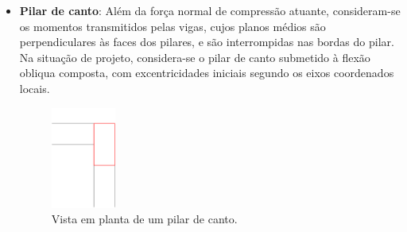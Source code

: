 \begin{itemize}
	\item \textbf{Pilar de canto}: Além da força normal de compressão atuante, consideram-se os momentos transmitidos pelas vigas, cujos planos médios são perpendiculares às faces dos pilares, e são interrompidas nas bordas do pilar. Na situação de projeto, considera-se o pilar de canto submetido à flexão obliqua composta, com excentricidades iniciais segundo os eixos coordenados locais.

	\begin{figure}[H]
		\begin{center}
		\caption{Vista em planta de um pilar de canto.}
    		\includegraphics[width=0.2\textwidth]{Pilar-intermediario-de-extremidade-e-de-canto/Imagens/Pilar-de-canto.png}
		\end{center}
	\end{figure}

\end{itemize}